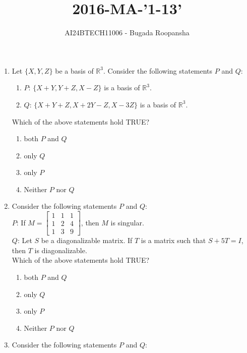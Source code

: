 \documentclass[journal,12pt,twocolumn]{IEEEtran}
\theoremstyle{remark}
\begin{document}

\vspace{3cm}
\title{2016-MA-'1-13'}
\author{AI24BTECH11006 - Bugada Roopansha}
\maketitle

\begin{enumerate}[start=1]
 
    \item Let $\{X, Y, Z\}$ be a basis of $\mathbb{R}^3$. Consider the following statements $P$ and $Q$: 
    \begin{enumerate}
        \item $P$: $\{X+Y, Y+Z, X-Z\}$ is a basis of $\mathbb{R}^3$.
        \item $Q$: $\{X + Y + Z, X+2Y - Z, X-3Z\}$ is a basis of $\mathbb{R}^3$.
    \end{enumerate}
    Which of the above statements hold TRUE?
    \begin{enumerate}
        \item both $P$ and $Q$
        \item only $Q$
        \item only $P$
        \item Neither $P$ nor $Q$
    \end{enumerate}

    \item Consider the following statements $P$ and $Q$:\\
      $P$: If $M = \begin{bmatrix} 1 & 1 & 1 \\ 1 & 2 & 4 \\ 1 & 3 & 9 \end{bmatrix}$, then $M$ is singular.\\
 $Q$: Let $S$ be a diagonalizable matrix. If $T$ is a matrix such that $S + 5T = I$, then $T$ is diagonalizable.\\
    Which of the above statements hold TRUE?
    \begin{enumerate}
        \item both $P$ and $Q$
        \item only $Q$
        \item only $P$
        \item Neither $P$ nor $Q$
    \end{enumerate}

    \item Consider the following statements $P$ and $Q$:\\
       

\end{enumerate}
\end{document}
